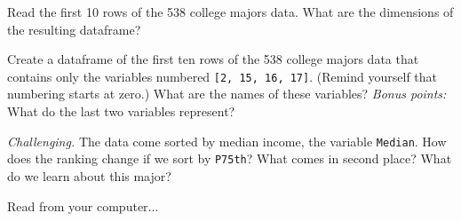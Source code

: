 \documentclass[11pt]{exam}
\begin{document}
\begin{questions}
\item Read the first 10 rows of the 538 college majors data.  
What are the dimensions of the resulting dataframe?  

\item Create a dataframe of the first ten rows of the 538 college majors data 
that contains only the variables numbered \texttt{[2, 15, 16, 17]}.  
(Remind yourself that numbering starts at zero.)
What are the names of these variables?  
{\it Bonus points:\/} What do the last two variables represent?  

\item {\it Challenging.\/} 
The data come sorted by median income, the variable \texttt{Median}.  
How does the ranking change if we sort by \texttt{P75th}?  
What comes in second place?  What do we learn about this major?  

\item Read from your computer...


\end{questions}
\end{document}
